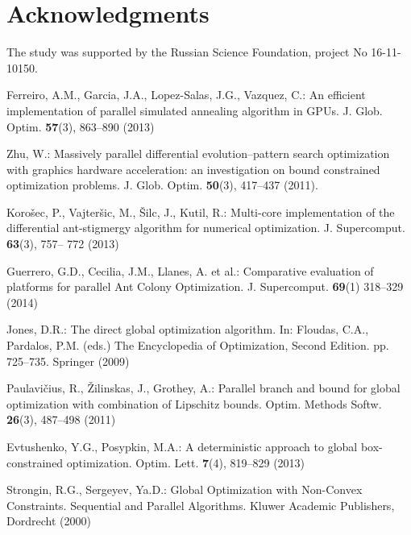 \documentclass{llncs}
\begin{document}
\section*{Acknowledgments}
The study was supported by the Russian Science Foundation, project No 16-11-10150.

\begin{thebibliography}{99}

Ferreiro, A.M., Garcia, J.A., Lopez-Salas, J.G., Vazquez, C.: An efficient implementation of 
parallel simulated annealing algorithm in GPUs. J. Glob. Optim. \textbf{57}(3), 863--890 (2013)

Zhu, W.: Massively parallel differential evolution--pattern search optimization with graphics 
hardware acceleration: an investigation on bound constrained optimization problems. J. Glob. 
Optim. \textbf{50}(3), 417--437 (2011).

Koro\v sec, P., Vajter\v sic, M.,  \v Silc, J., Kutil, R.: Multi-core implementation of the 
differential ant-stigmergy algorithm for numerical optimization. J. Supercomput. \textbf{63}(3), 757--
772 (2013)

Guerrero, G.D., Cecilia, J.M., Llanes, A. et al.: Comparative evaluation of platforms for parallel 
Ant Colony Optimization. J. Supercomput. \textbf{69}(1) 318--329 (2014)

Jones, D.R.: The direct global optimization algorithm. In: Floudas, C.A., Pardalos, P.M. (eds.) 
The Encyclopedia of Optimization, Second Edition. pp. 725--735. Springer (2009)

Paulavi\v cius, R., \v Zilinskas, J., Grothey, A.: Parallel branch and bound for global 
optimization with combination of Lipschitz bounds. Optim. Methods Softw. \textbf{26}(3), 487--498 
(2011)

Evtushenko, Y.G., Posypkin, M.A.: A deterministic approach to global box-constrained 
optimization. Optim. Lett. \textbf{7}(4), 819--829 (2013)

Strongin, R.G., Sergeyev, Ya.D.: Global Optimization with Non-Convex Constraints. 
Sequential and Parallel Algorithms. Kluwer Academic Publishers, Dordrecht (2000)



\end{thebibliography}
\end{document}

